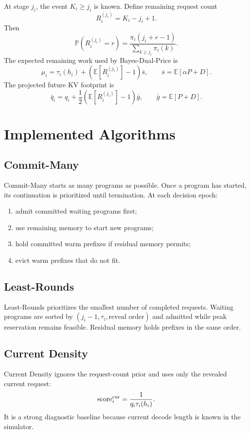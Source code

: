 \documentclass[11pt]{article}
\newcommand{\E}{\mathbb E}
\newcommand{\Prb}{\mathbb P}
\begin{document}
At stage $j_i$, the event $K_i\ge j_i$ is known.  Define remaining request count
\[
    R_i^{(j_i)}=K_i-j_i+1.
\]
Then
\[
    \Prb(R_i^{(j_i)}=r)
    =
    \frac{\pi_i(j_i+r-1)}{\sum_{k\ge j_i}\pi_i(k)}.
\]
The expected remaining work used by Bayes-Dual-Price is
\[
    \mu_i=\tau_i(h_i)+\left(\E[R_i^{(j_i)}]-1\right)\bar s,
    \qquad
    \bar s=\E[\alpha P+D].
\]
The projected future KV footprint is
\[
    \bar q_i=q_i+\frac12\left(\E[R_i^{(j_i)}]-1\right)\bar g,
    \qquad
    \bar g=\E[P+D].
\]

\section{Implemented Algorithms}

\subsection{Commit-Many}

Commit-Many starts as many programs as possible.  Once a program has started,
its continuation is prioritized until termination.  At each decision epoch:
\begin{enumerate}
    \item admit committed waiting programs first;
    \item use remaining memory to start new programs;
    \item hold committed warm prefixes if residual memory permits;
    \item evict warm prefixes that do not fit.
\end{enumerate}

\subsection{Least-Rounds}

Least-Rounds prioritizes the smallest number of completed requests.  Waiting
programs are sorted by $(j_i-1,\tau_i,\text{reveal order})$ and admitted while
peak reservation remains feasible.  Residual memory holds prefixes in the same
order.

\subsection{Current Density}

Current Density ignores the request-count prior and uses only the revealed
current request:
\[
    \operatorname{score}_i^{\rm cur}=\frac{1}{q_i\tau_i(h_i)}.
\]
It is a strong diagnostic baseline because current decode length is known in
the simulator.
\end{document}
